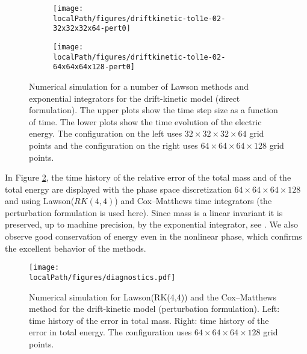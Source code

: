 \begin{figure}[h]
	\centering
	\begin{subfigure}[b]{0.48\textwidth}
        \centering \texttt{[image: \\localPath/figures/driftkinetic-tol1e-02-32x32x32x64-pert0]}%
	\end{subfigure}
	\begin{subfigure}[b]{0.48\textwidth}
         \centering \texttt{[image: \\localPath/figures/driftkinetic-tol1e-02-64x64x64x128-pert0]}%
	\end{subfigure}
	\caption{Numerical simulation for a number of Lawson methods and exponential integrators for the drift-kinetic model (direct formulation). The upper plots show the time step size as a function of time. The lower plots show the time evolution of the electric energy. The configuration on the left uses $32 \times 32 \times 32 \times 64$ grid points and the configuration on the right uses $64 \times 64 \times 64 \times 128$ grid points.}\label{fig:driftkinetic-pert0}
\end{figure}

In Figure \ref{fig:mass_energy}, the time history of the relative error of the total mass and of the total energy 
are displayed with the phase space discretization $64\times 64\times 64\times 128$ and 
using Lawson($RK(4,4)$) and Cox--Matthews time integrators (the perturbation formulation is used here). Since mass is a linear invariant it is preserved, up to machine precision, by the exponential integrator, see \cite{le2015KP}. We also observe good conservation of energy even in the nonlinear phase, which confirms the excellent behavior of the methods. 

\begin{figure}[h]
	\centering
        \centering \texttt{[image: \\localPath/figures/diagnostics.pdf]}
    \caption{Numerical simulation for Lawson(RK(4,4)) and the Cox--Matthews method for the drift-kinetic model (perturbation formulation). Left: time history of the error in total mass. 
	Right: time history of the error in total energy. The configuration uses  $64 \times 64 \times 64 \times 128$ grid points.}
	\label{fig:mass_energy}
\end{figure}


